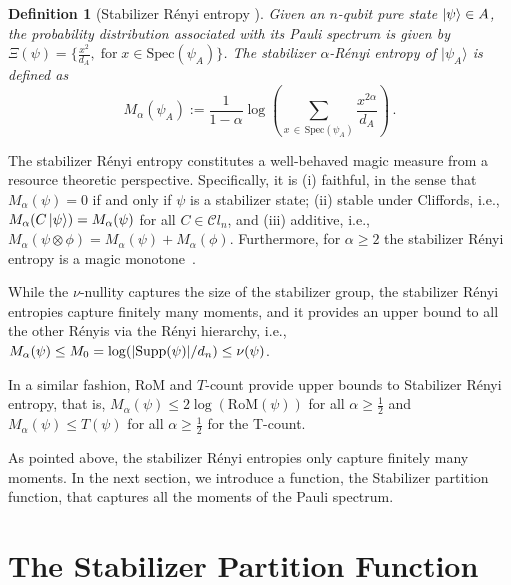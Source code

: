 \documentclass[aps,pra,superscriptaddress,twocolumn,longbibliography]{revtex4-2}
\newtheorem{definition}{Definition}
\begin{document}
\begin{definition}[Stabilizer R\'enyi entropy \cite{Leone/Stab_Renyi/2022}]

Given an $n$-qubit pure state $\ket{\psi}\in A$, the probability distribution associated with its Pauli spectrum is given by $\Xi(\psi)=\{ \frac{x^2}{d_A}, \; \text{for}\; x \in \text{Spec}(\psi_A)\}$. The stabilizer $\alpha$-R\'enyi entropy of $|\psi_A\rangle$ is defined as
%
\begin{equation}
    M_{\alpha}(\psi_A):=\frac{1}{1-\alpha}\log \left(\sum_{x \,\in \,\text{Spec}(\psi_A)} \frac{x^{2\alpha}}{d_A}  \right)\,.
\end{equation}
%
\end{definition}

The stabilizer R\'enyi entropy constitutes a well-behaved magic measure from a resource theoretic perspective. Specifically, it is (i) faithful, in the sense that $M_{\alpha}(\psi)=0$ if and only if $\psi$ is a stabilizer state; (ii) stable under Cliffords, i.e., $M_{\alpha}(C\ket{\psi})=M_{\alpha}(\psi)$ for all $C \in \mathcal{C}l_{n}$, and (iii) additive, i.e.,
$M_{\alpha}(\psi\otimes \phi)= M_{\alpha}(\psi)+M_{\alpha}(\phi)$. Furthermore, for $\alpha \geq 2$ the stabilizer R\'enyi entropy is a magic monotone~\cite{Leone/Stab_Renyi_monotone/2024}.


While the $\nu$-nullity captures the size of the stabilizer group, the stabilizer R\'enyi entropies capture finitely many moments,
and it provides an upper bound to all the other R\'enyis via the R\'enyi hierarchy, i.e., $M_{\alpha}(\psi)\leq M_0 = \log(|{\rm Supp}(\psi)|/d_n) \leq \nu(\psi)$.

In a similar fashion, $\text{RoM}$ and $T$-count provide upper bounds to Stabilizer R\'enyi entropy, that is, $M_{\alpha}(\psi) \leq 2\log(\text{RoM}(\psi))$ for all $\alpha \geq \frac{1}{2}$ and $M_{\alpha}(\psi) \leq T(\psi)$ for all $\alpha \geq \frac{1}{2}$ for the T-count. 

As pointed above, the stabilizer R\'enyi entropies only capture finitely many moments. 
In the next section, we introduce a function, the Stabilizer partition function, that captures all the moments of the Pauli spectrum.

\section{The Stabilizer Partition Function}\label{sec:SPF}
\end{document}
